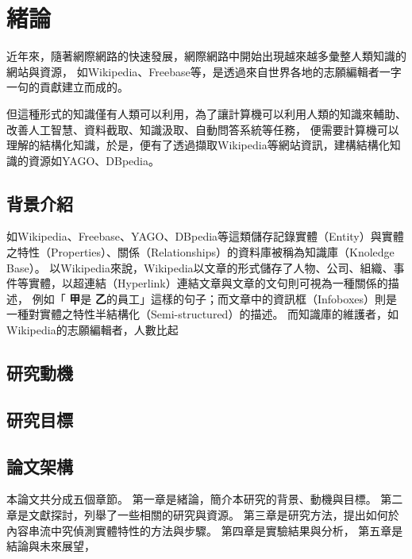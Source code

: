 \chapter{緒論}
\label{c:intro}


近年來，隨著網際網路的快速發展，網際網路中開始出現越來越多彙整人類知識的網站與資源，
如Wikipedia、Freebase等，是透過來自世界各地的志願編輯者一字一句的貢獻建立而成的。

但這種形式的知識僅有人類可以利用，為了讓計算機可以利用人類的知識來輔助、改善人工智慧、資料截取、知識汲取、自動問答系統等任務，
便需要計算機可以理解的結構化知識，於是，便有了透過擷取Wikipedia等網站資訊，建構結構化知識的資源如YAGO、DBpedia。


\section{背景介紹}
如Wikipedia、Freebase、YAGO、DBpedia等這類儲存記錄實體（Entity）與實體之特性（Properties）、關係（Relationships）的資料庫被稱為知識庫（Knoledge Base）。
以Wikipedia來說，Wikipedia以文章的形式儲存了人物、公司、組織、事件等實體，以超連結（Hyperlink）連結文章與文章的文句則可視為一種關係的描述，
例如「
\textbf{甲}是
\textbf{乙}的員工」這樣的句子；而文章中的資訊框（Infoboxes）則是一種對實體之特性半結構化（Semi-structured）的描述。    
而知識庫的維護者，如Wikipedia的志願編輯者，人數比起

\section{研究動機}

\section{研究目標}

\section{論文架構}  %
本論文共分成五個章節。
第一章是緒論，簡介本研究的背景、動機與目標。
第二章是文獻探討，列舉了一些相關的研究與資源。
第三章是研究方法，提出如何於內容串流中究偵測實體特性的方法與步驟。
第四章是實驗結果與分析，
第五章是結論與未來展望，


